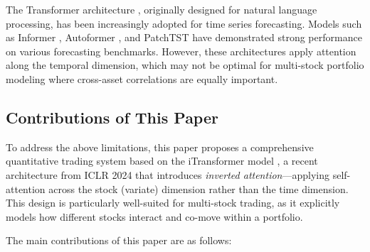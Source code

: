 \documentclass[12pt, a4paper]{article}
\begin{document}
The Transformer architecture \citep{vaswani2017attention}, originally designed for natural language processing, has been increasingly adopted for time series forecasting. Models such as Informer \citep{zhou2021informer}, Autoformer \citep{wu2021autoformer}, and PatchTST \citep{nie2023patchtst} have demonstrated strong performance on various forecasting benchmarks. However, these architectures apply attention along the temporal dimension, which may not be optimal for multi-stock portfolio modeling where cross-asset correlations are equally important.

\subsection{Contributions of This Paper}

To address the above limitations, this paper proposes a comprehensive quantitative trading system based on the iTransformer model \citep{liu2024itransformer}, a recent architecture from ICLR 2024 that introduces \emph{inverted attention}---applying self-attention across the stock (variate) dimension rather than the time dimension. This design is particularly well-suited for multi-stock trading, as it explicitly models how different stocks interact and co-move within a portfolio.

The main contributions of this paper are as follows:
\end{document}
